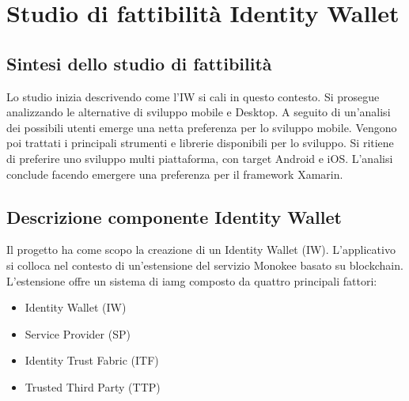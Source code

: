 
\section{Studio di fattibilità Identity Wallet}
\subsection{Sintesi dello studio di fattibilità}
Lo studio inizia descrivendo come l’IW si cali in questo contesto. Si prosegue analizzando le alternative di sviluppo mobile e Desktop. A seguito di un’analisi dei possibili utenti emerge una netta preferenza per lo sviluppo mobile.
Vengono poi trattati i principali strumenti e librerie disponibili per lo sviluppo. Si ritiene di preferire uno sviluppo multi piattaforma, con target Android e iOS. L’analisi conclude facendo emergere una preferenza per il framework Xamarin.
\subsection{Descrizione componente Identity Wallet} 
Il progetto ha come scopo la creazione di un Identity Wallet (IW). L’applicativo si colloca nel contesto di un’estensione del servizio Monokee basato su blockchain. L’estensione offre un sistema di \gls{iamg} composto da quattro principali fattori:
\begin{itemize}
    \item Identity Wallet (IW)
    \item Service Provider (SP)
    \item Identity Trust Fabric (ITF)
    \item Trusted Third Party (TTP)
\end{itemize}
    
